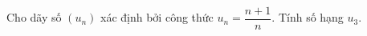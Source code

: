 \begin{ex}
Cho dãy số $(u_n)$ xác định bởi công thức $u_n=\dfrac{n+1}{n}$. Tính số hạng $u_3$.
\end{ex}
